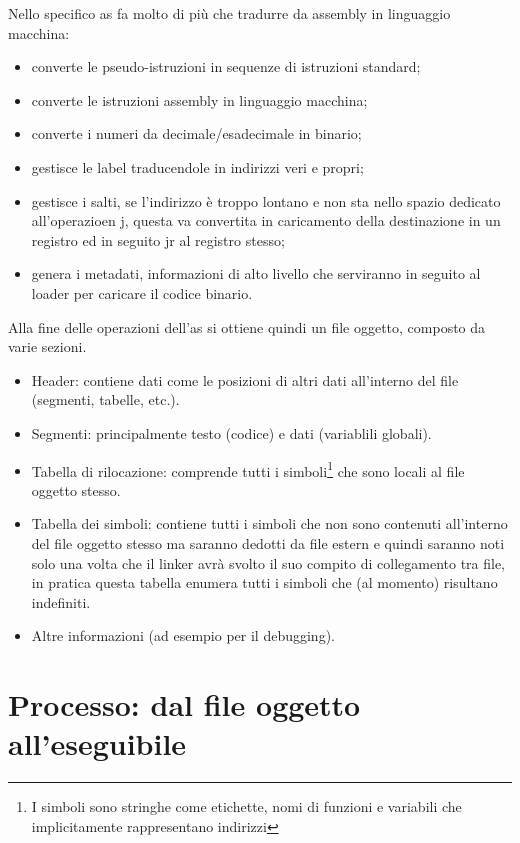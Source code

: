 \documentclass[class=book, crop=false, oneside]{standalone}
\begin{document}
Nello specifico as fa molto di più che tradurre da assembly in linguaggio macchina:
\begin{itemize}
	\item converte le pseudo-istruzioni in sequenze di istruzioni standard;
	\item converte le istruzioni assembly in linguaggio macchina;
	\item converte i numeri da decimale/esadecimale in binario;
	\item gestisce le label traducendole in indirizzi veri e propri;
	\item gestisce i salti, se l'indirizzo è troppo lontano e non sta nello spazio dedicato all'operazioen j, questa va convertita in caricamento della destinazione in un registro ed in seguito jr al registro stesso;
	\item genera i metadati, informazioni di alto livello che serviranno in seguito al loader per caricare il codice binario.
\end{itemize}

Alla fine delle operazioni dell'as si ottiene quindi un file oggetto, composto da varie sezioni.
\begin{itemize}
	\item Header: contiene dati come le posizioni di altri dati all'interno del file (segmenti, tabelle, etc.).
	\item Segmenti: principalmente testo (codice) e dati (variablili globali).
	\item Tabella di rilocazione: comprende tutti i simboli\footnote{I simboli sono stringhe come etichette, nomi di funzioni e variabili che implicitamente rappresentano indirizzi} che sono locali al file oggetto stesso.
	\item Tabella dei simboli: contiene tutti i simboli che non sono contenuti all'interno del file oggetto stesso ma saranno dedotti da file estern e quindi saranno noti solo una volta che il linker avrà svolto il suo compito di collegamento tra file, in pratica questa tabella enumera tutti i simboli che (al momento) risultano indefiniti.
	\item Altre informazioni (ad esempio per il debugging).
\end{itemize}

\section{Processo: dal file oggetto all'eseguibile}
\end{document}
